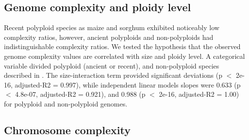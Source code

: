 \subsection{Genome complexity and ploidy level}
\label{sec:genome-compl-ploidy}

Recent polyploid species as maize and sorghum exhibited noticeably low complexity ratios, however, ancient polyploids and non-polyploids had indistinguishable complexity ratios. We tested the hypothesis that the observed genome complexity values are correlated with size and ploidy level. A categorical variable divided polyploid (ancient or recent), and non-polyploid species described in . The size-interaction term provided significant deviations (p $<$ 2e-16, adjusted-R2 = 0.997), while independent linear models slopes were 0.633 (p $<$ 4.8e-07, adjusted-R2 = 0.921), and 0.988 (p $<$ 2e-16, adjusted-R2 = 1.00) for polyploid and non-polyploid genomes. 

\subsection{Chromosome complexity}
\label{sec:chrom-compl}

